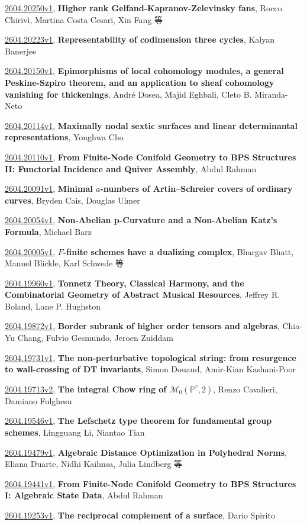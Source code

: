\documentclass[9pt, a4paper]{article}
\theoremstyle{plain}
\theoremstyle{definition}
\theoremstyle{remark}
\newcommand{\arxiv}[3]{\href{https://arxiv.org/abs/#1}{#1}, \textbf{\textcolor{arxivblue}{#2}}, #3}
\begin{document}
\arxiv{2604.20250v1}{Higher rank Gelfand-Kapranov-Zelevinsky fans}{Rocco Chirivì, Martina Costa Cesari, Xin Fang 等}

\arxiv{2604.20223v1}{Representability of codimension three cycles}{Kalyan Banerjee}

\arxiv{2604.20150v1}{Epimorphisms of local cohomology modules, a general Peskine-Szpiro theorem, and an application to sheaf cohomology vanishing for thickenings}{André Dosea, Majid Eghbali, Cleto B. Miranda-Neto}

\arxiv{2604.20114v1}{Maximally nodal sextic surfaces and linear determinantal representations}{Yonghwa Cho}

\arxiv{2604.20110v1}{From Finite-Node Conifold Geometry to BPS Structures II: Functorial Incidence and Quiver Assembly}{Abdul Rahman}

\arxiv{2604.20091v1}{Minimal $a$-numbers of Artin--Schreier covers of ordinary curves}{Bryden Cais, Douglas Ulmer}

\arxiv{2604.20054v1}{Non-Abelian p-Curvature and a Non-Abelian Katz's Formula}{Michael Barz}

\arxiv{2604.20005v1}{$F$-finite schemes have a dualizing complex}{Bhargav Bhatt, Manuel Blickle, Karl Schwede 等}

\arxiv{2604.19960v1}{Tonnetz Theory, Classical Harmony, and the Combinatorial Geometry of Abstract Musical Resources}{Jeffrey R. Boland, Lane P. Hughston}

\arxiv{2604.19872v1}{Border subrank of higher order tensors and algebras}{Chia-Yu Chang, Fulvio Gesmundo, Jeroen Zuiddam}

\arxiv{2604.19731v1}{The non-perturbative topological string: from resurgence to wall-crossing of DT invariants}{Simon Douaud, Amir-Kian Kashani-Poor}

\arxiv{2604.19713v2}{The integral Chow ring of $\mathscr{M}_{0}(\mathbb{P}^r, 2)$}{Renzo Cavalieri, Damiano Fulghesu}

\arxiv{2604.19546v1}{The Lefschetz type theorem for fundamental group schemes}{Lingguang Li, Niantao Tian}

\arxiv{2604.19479v1}{Algebraic Distance Optimization in Polyhedral Norms}{Eliana Duarte, Nidhi Kaihnsa, Julia Lindberg 等}

\arxiv{2604.19441v1}{From Finite-Node Conifold Geometry to BPS Structures I: Algebraic State Data}{Abdul Rahman}

\arxiv{2604.19253v1}{The reciprocal complement of a surface}{Dario Spirito}
\end{document}

